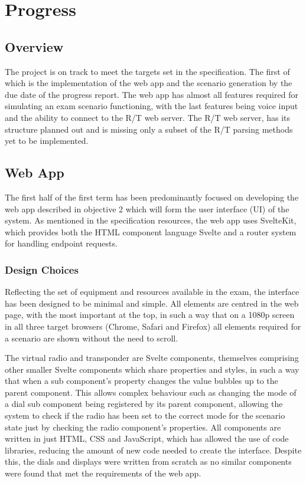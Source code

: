 \section{Progress}
\label{sec:progress}

\subsection{Overview}
The project is on track to meet the targets set in the specification. The first of which is the implementation of the web app and the scenario generation by the due date of the progress report. The web app has almost all features required for simulating an exam scenario functioning, with the last features being voice input and the ability to connect to the R/T web server. The R/T web server, has its structure planned out and is missing only a subset of the R/T parsing methods yet to be implemented.

\subsection{Web App}
The first half of the first term has been predominantly focused on developing the web app described in objective 2 which will form the user interface (UI) of the system. As mentioned in the specification resources, the web app uses SvelteKit, which provides both the HTML component language Svelte and a router system for handling endpoint requests.

\subsubsection{Design Choices}
Reflecting the set of equipment and resources available in the exam, the interface has been designed to be minimal and simple. All elements are centred in the web page, with the most important at the top, in such a way that on a 1080p screen in all three target browsers (Chrome, Safari and Firefox) all elements required for a scenario are shown without the need to scroll.

The virtual radio and transponder are Svelte components, themselves comprising other smaller Svelte components which share properties and styles, in such a way that when a sub component's property changes the value bubbles up to the parent component. This allows complex behaviour such as changing the mode of a dial sub component being registered by its parent component, allowing the system to check if the radio has been set to the correct mode for the scenario state just by checking the radio component's properties. All components are written in just HTML, CSS and JavaScript, which has allowed the use of code libraries, reducing the amount of new code needed to create the interface. Despite this, the dials and displays were written from scratch as no similar components were found that met the requirements of the web app.

